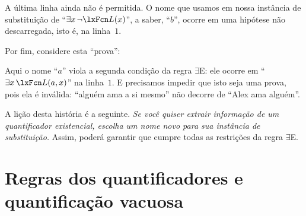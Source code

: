 A última linha ainda não é permitida. O nome que usamos em nossa instância de substituição de \textquotedblleft $\exists x\, \enot \atom{L}{x}$\textquotedblright{}, a saber, \textquotedblleft $b$\textquotedblright{}, ocorre em uma hipótese não descarregada, isto é, na linha~$1$.

Por fim, considere esta \textquotedblleft prova\textquotedblright{}:
\begin{fitchproof}
	\PR
	\open
		\AS
	\close
\ifHTMLtarget
\else
\fi
\end{fitchproof}
Aqui o nome \textquotedblleft $a$\textquotedblright{} viola a segunda condição da regra $\exists$E: ele ocorre em \textquotedblleft $\exists x\, \atom{L}{a,x}$\textquotedblright{} na linha~$1$. E precisamos impedir que isto seja uma prova, pois ela é inválida: \textquotedblleft alguém ama a si mesmo\textquotedblright{} não decorre de \textquotedblleft Alex ama alguém\textquotedblright{}.




A lição desta história é a seguinte. \emph{Se você quiser extrair informação de um quantificador existencial, escolha um nome novo para sua instância de substituição.} Assim, poderá garantir que cumpre todas as restrições da regra $\exists$E.

\section{Regras dos quantificadores e quantificação vacuosa}

